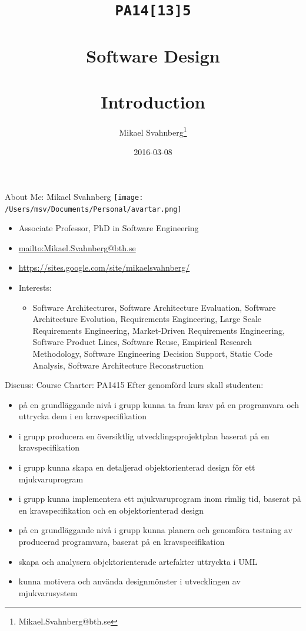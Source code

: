 \documentclass[10pt,t,a4paper]{beamer}
\author{Mikael Svahnberg\thanks{Mikael.Svahnberg@bth.se}}
\date{2016-03-08}
\title{\texttt{PA14[13]5} \\\\Software Design\\\\Introduction}
\begin{document}
\maketitle

\begin{frame}[label=sec-1]{About Me: Mikael Svahnberg}
\texttt{[image: /Users/msv/Documents/Personal/avartar.png]}
\begin{itemize}
\item Associate Professor, PhD in Software Engineering
\item \url{mailto:Mikael.Svahnberg@bth.se}
\item \url{https://sites.google.com/site/mikaelsvahnberg/}
\item Interests:
\begin{itemize}
\item Software Architectures, Software Architecture Evaluation, Software Architecture Evolution, Requirements Engineering, Large Scale Requirements Engineering, Market-Driven Requirements Engineering, Software Product Lines, Software Reuse, Empirical Research Methodology, Software Engineering Decision Support, Static Code Analysis, Software Architecture Reconstruction
\end{itemize}
\end{itemize}
\end{frame}
\begin{frame}[label=sec-2]{Discuss: Course Charter: PA1415}
Efter genomförd kurs skall studenten:
\begin{itemize}
\item på en grundläggande nivå i grupp kunna ta fram krav på en programvara och uttrycka dem i en kravspecifikation
\item i grupp producera en översiktlig utvecklingsprojektplan baserat på en kravspecifikation
\item i grupp kunna skapa en detaljerad objektorienterad design för ett mjukvaruprogram
\item i grupp kunna implementera ett mjukvaruprogram inom rimlig tid, baserat på en kravspecifikation och en objektorienterad design
\item på en grundläggande nivå i grupp kunna planera och genomföra testning av producerad programvara, baserat på en kravspecifikation
\item skapa och analysera objektorienterade artefakter uttryckta i UML
\item kunna motivera och använda designmönster i utvecklingen av mjukvarusystem
\end{itemize}
\end{frame}
\end{document}
